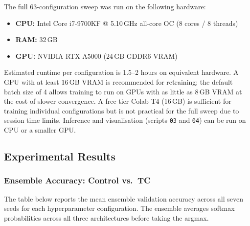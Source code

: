 \documentclass[12pt,a4paper]{article}
\begin{document}
The full 63-configuration sweep was run on the following hardware:

\begin{itemize}
    \item \textbf{CPU:} Intel Core i7-9700KF @ 5.10\,GHz all-core OC (8 cores / 8 threads)
    \item \textbf{RAM:} 32\,GB
    \item \textbf{GPU:} NVIDIA RTX A5000 (24\,GB GDDR6 VRAM)
\end{itemize}

Estimated runtime per configuration is 1.5--2 hours on equivalent hardware.
A GPU with at least 16\,GB VRAM is recommended for retraining; the default
batch size of 4 allows training to run on GPUs with as little as 8\,GB VRAM
at the cost of slower convergence. A free-tier Colab T4 (16\,GB) is sufficient
for training individual configurations but is not practical for the full sweep
due to session time limits.
Inference and visualisation (scripts \texttt{03} and \texttt{04}) can be run
on CPU or a smaller GPU.

\subsection{Experimental Results}
\label{sec:pg-results}

\subsubsection{Ensemble Accuracy: Control vs.\ TC}

The table below reports the mean ensemble validation accuracy across all seven
seeds for each hyperparameter configuration. The ensemble averages softmax
probabilities across all three architectures before taking the argmax.
\end{document}

